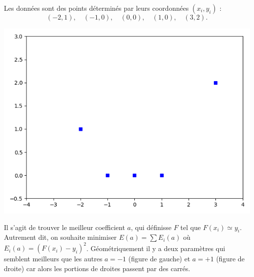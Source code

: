 Les données sont des points déterminés par leurs coordonnées $(x_i,y_i)$ :
$$(-2,1),\quad  (-1,0),\quad (0,0),\quad (1,0),\quad (3,2).$$

\begin{center}
	\includegraphics[scale=\myscale,scale=0.45]{figures/retro_04_a}
\end{center}

Il s'agit de trouver le meilleur coefficient $a$, qui définisse $F$ tel que $F(x_i) \simeq y_i$. Autrement dit, on souhaite minimiser $E(a) = \sum E_i(a)$ où $E_i(a) = (F(x_i)-y_i)^2$.
Géométriquement il y a deux paramètres qui semblent meilleurs que les autres $a=-1$ (figure de gauche) et $a=+1$ (figure de droite) car alors les portions de droites passent par des carrés.

